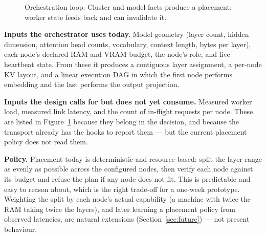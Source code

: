 \documentclass[11pt,a4paper]{article}
\begin{document}
\begin{figure}[h]
\centering
{}
\caption{Orchestration loop. Cluster and model facts produce a placement; worker
state feeds back and can invalidate it.}
\label{fig:orch}
\end{figure}

\textbf{Inputs the orchestrator uses today.} Model geometry (layer count, hidden
dimension, attention head counts, vocabulary, context length, bytes per layer),
each node's declared RAM and VRAM budget, the node's role, and live heartbeat
state. From these it produces a contiguous layer assignment, a per-node KV
layout, and a linear execution DAG in which the first node performs embedding and
the last performs the output projection.

\textbf{Inputs the design calls for but does not yet consume.} Measured worker
load, measured link latency, and the count of in-flight requests per node. These
are listed in Figure~\ref{fig:orch} because they belong in the decision, and
because the transport already has the hooks to report them --- but the current
placement policy does not read them.

\textbf{Policy.} Placement today is deterministic and resource-based: split the
layer range as evenly as possible across the configured nodes, then verify each
node against its budget and refuse the plan if any node does not fit. This is
predictable and easy to reason about, which is the right trade-off for a
one-week prototype. Weighting the split by each node's actual capability
(a machine with twice the RAM taking twice the layers), and later learning a
placement policy from observed latencies, are natural extensions
(Section~\ref{sec:future}) --- not present behaviour.
\end{document}
